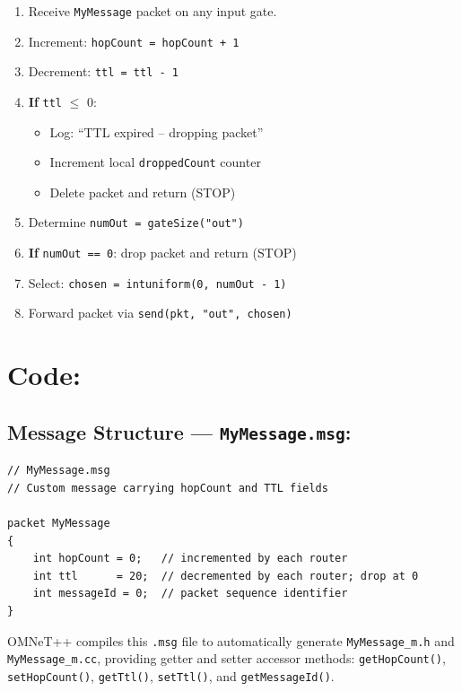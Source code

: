 \documentclass[12pt,a4paper]{article}
\begin{document}
\begin{enumerate}[label=\textbf{Step \arabic*.}, leftmargin=*, noitemsep]
  \item Receive \texttt{MyMessage} packet on any input gate.
  \item Increment: \texttt{hopCount = hopCount + 1}
  \item Decrement: \texttt{ttl = ttl - 1}
  \item \textbf{If} \texttt{ttl} $\leq$ 0:
    \begin{itemize}
      \item Log: ``TTL expired -- dropping packet''
      \item Increment local \texttt{droppedCount} counter
      \item Delete packet and return (STOP)
    \end{itemize}
  \item Determine \texttt{numOut = gateSize("out")}
  \item \textbf{If} \texttt{numOut == 0}: drop packet and return (STOP)
  \item Select: \texttt{chosen = intuniform(0, numOut - 1)}
  \item Forward packet via \texttt{send(pkt, "out", chosen)}
\end{enumerate}


\section{Code: }

\subsection{Message Structure --- \texttt{MyMessage.msg}: }

\begin{lstlisting}[style=cppstyle, caption={MyMessage.msg -- Custom packet definition}]
// MyMessage.msg
// Custom message carrying hopCount and TTL fields

packet MyMessage
{
    int hopCount = 0;   // incremented by each router
    int ttl      = 20;  // decremented by each router; drop at 0
    int messageId = 0;  // packet sequence identifier
}
\end{lstlisting}

\justifying
OMNeT++ compiles this \texttt{.msg} file to automatically generate \texttt{MyMessage\_m.h} and \texttt{MyMessage\_m.cc}, providing getter and setter accessor methods: \texttt{getHopCount()}, \texttt{setHopCount()}, \texttt{getTtl()}, \texttt{setTtl()}, and \texttt{getMessageId()}.
\vspace{1cm}
\end{document}
